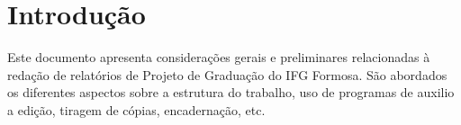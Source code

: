 \chapter*[Introdução]{Introdução}

Este documento apresenta considerações gerais e preliminares relacionadas 
à redação de relatórios de Projeto de Graduação do IFG Formosa. São abordados os diferentes aspectos sobre a estrutura do trabalho, 
uso de programas de auxilio a edição, tiragem de cópias, encadernação, etc.

